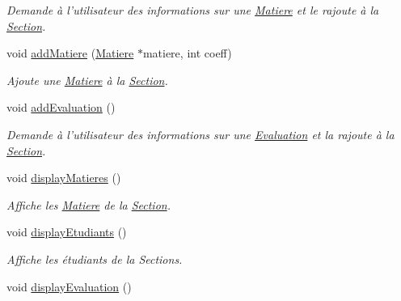 \begin{DoxyCompactItemize}
\begin{DoxyCompactList}\small\item\em Demande à l'utilisateur des informations sur une \hyperlink{class_matiere}{Matiere} et le rajoute à la \hyperlink{class_section}{Section}. \end{DoxyCompactList}\item 
void \hyperlink{class_section_a0780c65eae7b700bdbf064a92258a9e4}{add\-Matiere} (\hyperlink{class_matiere}{Matiere} $\ast$matiere, int coeff)
\begin{DoxyCompactList}\small\item\em Ajoute une \hyperlink{class_matiere}{Matiere} à la \hyperlink{class_section}{Section}. \end{DoxyCompactList}\item 
\hypertarget{class_section_ab69fdf65ad9bff767e1d3b2375245392}{void \hyperlink{class_section_ab69fdf65ad9bff767e1d3b2375245392}{add\-Evaluation} ()}\label{class_section_ab69fdf65ad9bff767e1d3b2375245392}

\begin{DoxyCompactList}\small\item\em Demande à l'utilisateur des informations sur une \hyperlink{class_evaluation}{Evaluation} et la rajoute à la \hyperlink{class_section}{Section}. \end{DoxyCompactList}\item 
\hypertarget{class_section_aa3bbef64322a8735737c954b904b2b7c}{void \hyperlink{class_section_aa3bbef64322a8735737c954b904b2b7c}{display\-Matieres} ()}\label{class_section_aa3bbef64322a8735737c954b904b2b7c}

\begin{DoxyCompactList}\small\item\em Affiche les \hyperlink{class_matiere}{Matiere} de la \hyperlink{class_section}{Section}. \end{DoxyCompactList}\item 
\hypertarget{class_section_a221a38b7f18e6c32e61b1c9e51ace2a9}{void \hyperlink{class_section_a221a38b7f18e6c32e61b1c9e51ace2a9}{display\-Etudiants} ()}\label{class_section_a221a38b7f18e6c32e61b1c9e51ace2a9}

\begin{DoxyCompactList}\small\item\em Affiche les étudiants de la Sections. \end{DoxyCompactList}\item 
\hypertarget{class_section_afc96e62025efee9f2bc82c42b57b4f0c}{void \hyperlink{class_section_afc96e62025efee9f2bc82c42b57b4f0c}{display\-Evaluation} ()}\label{class_section_afc96e62025efee9f2bc82c42b57b4f0c}


\end{DoxyCompactItemize}
